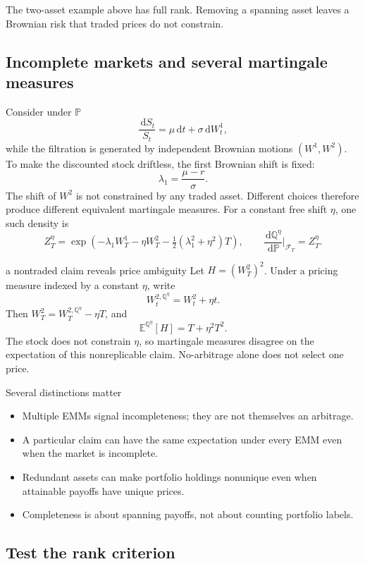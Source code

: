 \documentclass[10pt]{article}
\newcommand{\E}{\mathbb E}
\newcommand{\Pp}{\mathbb P}
\newcommand{\Q}{\mathbb Q}
\newcommand{\1}{\mathbf 1}
\newcommand{\cF}{\mathcal F}
\newcommand{\dd}{\,\mathrm d}
\theoremstyle{definition}
\begin{document}
The two-asset example above has full rank. Removing a spanning asset
leaves a Brownian risk that traded prices do not constrain.

\subsection{Incomplete markets and several martingale measures}

Consider under \(\Pp\)
\[
\frac{\dd S_t}{S_t}
=\mu\dd t+\sigma\dd W_t^1,
\]
while the filtration is generated by independent Brownian motions
\((W^1,W^2)\). To make the discounted stock driftless, the first Brownian
shift is fixed:
\[
\lambda_1=\frac{\mu-r}{\sigma}.
\]
The shift of \(W^2\) is not constrained by any traded asset. Different
choices therefore produce different equivalent martingale measures.
For a constant free shift \(\eta\), one such density is
\[
Z_T^\eta=\exp\!\left(-\lambda_1W_T^1-\eta W_T^2
-\tfrac12(\lambda_1^2+\eta^2)T\right),\qquad
\frac{\dd\Q^\eta}{\dd\Pp}\bigg|_{\cF_T}=Z_T^\eta.
\]

\begin{boardexample}{a nontraded claim reveals price ambiguity}
Let \(H=(W_T^2)^2\). Under a pricing measure indexed by a constant
\(\eta\), write
\[
W_t^{2,\Q^\eta}=W_t^2+\eta t.
\]
Then \(W_T^2=W_T^{2,\Q^\eta}-\eta T\), and
\[
\E^{\Q^\eta}[H]
=T+\eta^2T^2.
\]
The stock does not constrain \(\eta\), so martingale measures disagree on
the expectation of this nonreplicable claim. No-arbitrage alone does not
select one price.
\end{boardexample}

\begin{warningbox}{Several distinctions matter}
\begin{itemize}
  \item Multiple EMMs signal incompleteness; they are not themselves an
        arbitrage.
  \item A particular claim can have the same expectation under every EMM
        even when the market is incomplete.
  \item Redundant assets can make portfolio holdings nonunique even when
        attainable payoffs have unique prices.
  \item Completeness is about spanning payoffs, not about counting portfolio
        labels.
\end{itemize}
\end{warningbox}

\subsection{Test the rank criterion}
\end{document}
